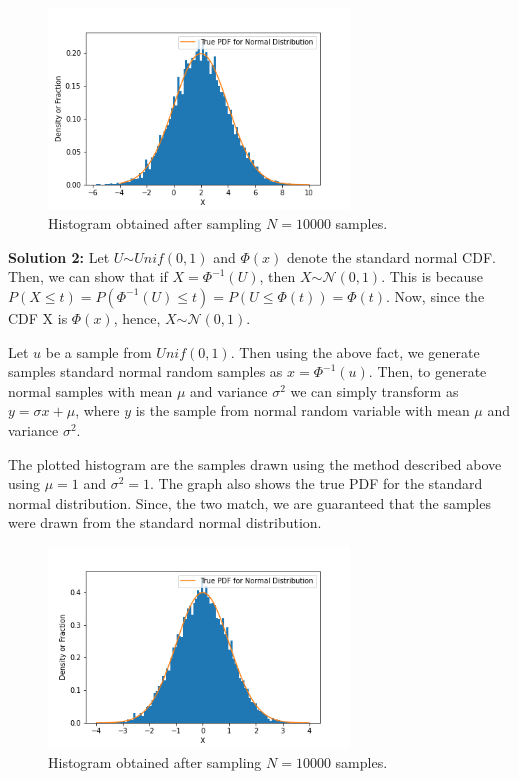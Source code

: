 \documentclass{article}
\begin{document}
\begin{enumerate}
	\noindent %
    \begin{figure}[H]
        \begin{center}
        \includegraphics[width=8cm]{Q2_1.png}
        \end{center}
        \caption{Histogram obtained after sampling $N=10000$ samples.}
    \end{figure} 
    \textbf{Solution 2:}
    Let $U \stackrel{}{\sim} Unif(0, 1)$ and $\Phi(x)$ denote the standard normal CDF. Then, we can show that if $X = \Phi^{-1}(U)$,
    then $X \stackrel{}{\sim} \mathcal{N}(0, 1)$. This is because $P(X \le t) = P(\Phi^{-1}(U) \le t) = P(U \le \Phi(t)) = \Phi(t)$. Now,
    since the CDF X is $\Phi(x)$, hence, $X \stackrel{}{\sim} \mathcal{N}(0, 1)$. \par
	
	\noindent %
    Let $u$ be a sample from $Unif(0, 1)$. Then using the above fact, we generate samples standard normal random samples as 
    $x =\Phi^{-1}(u)$. Then, to generate normal samples with mean $\mu$ and variance $\sigma^{2}$ we can simply transform as 
    $y = \sigma x + \mu$, where $y$ is the sample from normal random variable with mean $\mu$ and variance $\sigma^{2}$.\par
	
	\noindent %
    The plotted histogram are the samples drawn using the method described above using $\mu=1$ and $\sigma^{2}=1$. The graph also shows
    the true PDF for the standard normal distribution. Since, the two match, we are guaranteed that the samples were drawn from the
    standard normal distribution.

    \begin{figure}[H]
        \begin{center}
        \includegraphics[width=8cm]{Q2.png}
        \end{center}
        \caption{Histogram obtained after sampling $N=10000$ samples.}
    \end{figure}


\end{enumerate}
\end{document}

